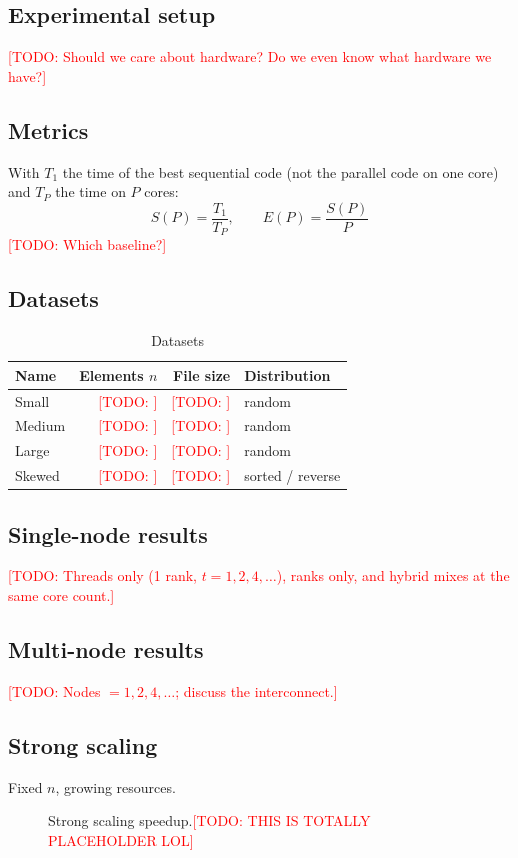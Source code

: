 \documentclass[11pt, titlepage]{article}
\newcommand{\TODO}[1]{\textcolor{red}{[TODO: #1]}}
\begin{document}
\subsection{Experimental setup}
\TODO{Should we care about hardware? Do we even know what hardware we have?}

\subsection{Metrics}
With $T_1$ the time of the best sequential code (not the parallel code on one core) and $T_P$ the time on $P$ cores:
\[
S(P)=\frac{T_1}{T_P},\qquad E(P)=\frac{S(P)}{P}
\]
\TODO{Which baseline?}

\subsection{Datasets}
\begin{table}[h]
  \centering
  \begin{tabular}{lrrl}
	\toprule
    Name & Elements $n$ & File size & Distribution\\
    \midrule
    Small & \TODO{} & \TODO{} & random\\
    Medium & \TODO{} & \TODO{} & random\\
    Large & \TODO{} & \TODO{} & random\\
    Skewed & \TODO{} & \TODO{} & sorted / reverse\\
    \bottomrule
  \end{tabular}
  \caption{Datasets}
\end{table}

\subsection{Single-node results}
\TODO{Threads only (1 rank, $t=1,2,4,\ldots$), ranks only, and hybrid mixes at the same core count.}

\subsection{Multi-node results}
\TODO{Nodes $=1,2,4,\ldots$; discuss the interconnect.}

\subsection{Strong scaling}
Fixed $n$, growing resources.
\begin{figure}[h]
  \centering
  \caption{Strong scaling speedup.\TODO{THIS IS TOTALLY PLACEHOLDER LOL}}
\end{figure}
\end{document}

